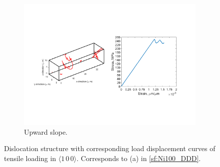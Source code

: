 \begin{figure}
    \begin{subfigure}[t]{\linewidth}
        \centering
        \includegraphics[trim={1.75cm 5cm 2.5cm 5.5cm},clip,width=\linewidth]{../data/11-Mar-2021_8_tensile_ni_100_120000.pdf}
        \caption{Upward slope.}
    \end{subfigure}
    \caption[Dislocation structure with corresponding load displacement curves of tensile loading in $\langle 1\, 0\, 0 \rangle$.]{Dislocation structure with corresponding load displacement curves of tensile loading in $\langle 1\, 0\, 0 \rangle$. Corresponds to (a) in \cref{sf:Ni100_DDD}.}
    \label{f:Ni100_bumps}
\end{figure}

